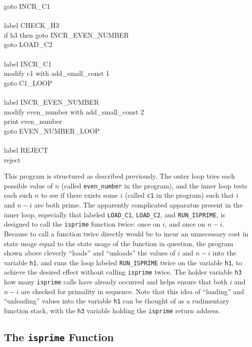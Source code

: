 {\indent \indent	goto INCR\_C1 \\ \\
\indent \indent	label CHECK\_H3 \\
\indent \indent	if h3 then goto INCR\_EVEN\_NUMBER \\
\indent \indent	goto LOAD\_C2 \\ \\
\indent \indent	label INCR\_C1 \\
\indent \indent	modify c1 with add\_small\_const 1 \\
\indent \indent	goto C1\_LOOP \\ \\
\indent	label INCR\_EVEN\_NUMBER \\
\indent	modify even\_number with add\_small\_const 2 \\
\indent	print even\_number \\
\indent	goto EVEN\_NUMBER\_LOOP \\ \\
label REJECT \\
reject \\ 
}		

This program is structured as described previously. The outer loop tries each possible value of $n$ (called \texttt{even\_number} in the program), and the inner loop tests each such $n$ to see if there exists some $i$ (called \texttt{c1} in the program) such that $i$ and $n-i$ are both prime. The apparently complicated apparatus present in the inner loop, especially that labeled \texttt{LOAD\_C1}, \texttt{LOAD\_C2}, and \texttt{RUN\_ISPRIME}, is designed to call the \texttt{isprime} function twice: once on $i$, and once on $n-i$. Because to call a function twice directly would be to incur an unnecessary cost in state usage equal to the state usage of the function in question, the program shown above cleverly ``loads'' and ``unloads'' the values of $i$ and $n-i$ into the variable \texttt{h1}, and runs the loop labeled \texttt{RUN\_ISPRIME} twice on the variable \texttt{h1}, to achieve the desired effect without calling \texttt{isprime} twice. The holder variable \texttt{h3} how many \texttt{isprime} calls have already occurred and helps ensure that both $i$ and $n-i$ are checked for primality in sequence. Note that this idea of ``loading'' and ``unloading'' values into the variable \texttt{h1} can be thought of as a rudimentary function stack, with the \texttt{h3} variable holding the \texttt{isprime} return address. 

\subsection{The \texttt{isprime} Function \label{sec:functionfilegoldbach}}

